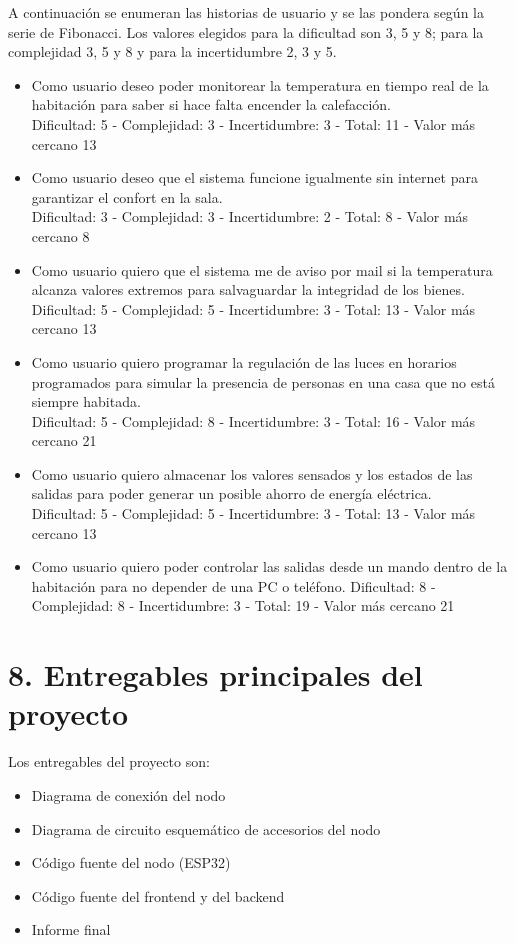 \documentclass[
11pt, %
]{charter}
\begin{document}
A continuación se enumeran las historias de usuario y se las pondera según la serie de Fibonacci. Los valores elegidos para la dificultad son 3, 5 y 8; para la complejidad 3, 5 y 8 y para la incertidumbre 2, 3 y 5.
\begin{itemize}
	\item Como usuario deseo poder monitorear la temperatura en tiempo real de la habitación para saber si hace falta encender la calefacción. \\
Dificultad: 5 - Complejidad: 3 - Incertidumbre: 3	 - Total: 11 - Valor más cercano 13
	\item Como usuario deseo que el sistema funcione igualmente sin internet para garantizar el confort en la sala. \\
Dificultad: 3 - Complejidad: 3 - Incertidumbre: 2	 - Total: 8 - Valor más cercano 8	
	\item Como usuario quiero que el sistema me de aviso por mail si la temperatura alcanza valores extremos para salvaguardar la integridad de los bienes. \\
Dificultad: 5 - Complejidad: 5 - Incertidumbre: 3	 - Total: 13 - Valor más cercano 13
	\item Como usuario quiero programar la regulación de las luces en horarios programados para simular la presencia de personas en una casa que no está siempre habitada. \\
Dificultad: 5 - Complejidad: 8 - Incertidumbre: 3	 - Total: 16 - Valor más cercano 21
	\item Como usuario quiero almacenar los valores sensados y los estados de las salidas para poder generar un posible ahorro de energía eléctrica. \\
Dificultad: 5 - Complejidad: 5 - Incertidumbre: 3	 - Total: 13 - Valor más cercano 13
	\item Como usuario quiero poder controlar las salidas desde un mando dentro de la habitación para no depender de una PC o teléfono.
Dificultad: 8 - Complejidad: 8 - Incertidumbre: 3	 - Total: 19 - Valor más cercano 21
\end{itemize}

\section{8. Entregables principales del proyecto}
\label{sec:entregables}

Los entregables del proyecto son:

\begin{itemize}
	\item Diagrama de conexión del nodo
	\item Diagrama de circuito esquemático de accesorios del nodo
	\item Código fuente del nodo (ESP32)
	\item Código fuente del frontend y del backend 
	\item Informe final
\end{itemize}
\end{document}
